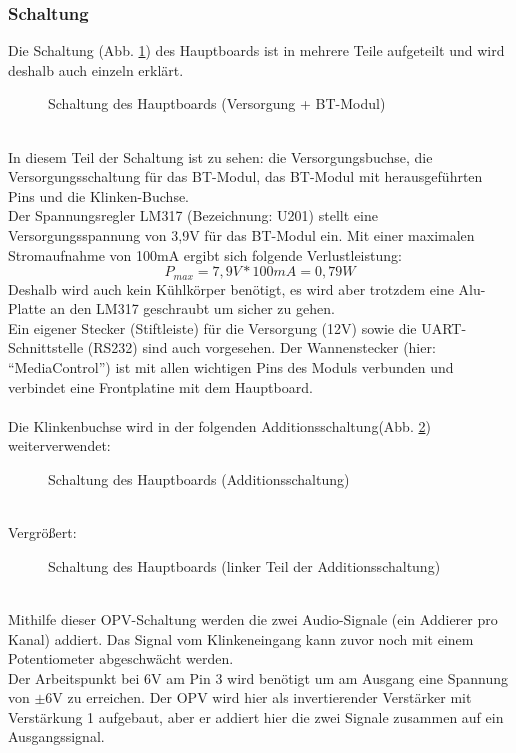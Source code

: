\subsubsection{Schaltung}
Die Schaltung (Abb. \ref{fig:abb3.3}) des Hauptboards ist in mehrere Teile aufgeteilt und wird deshalb auch einzeln erklärt.
\begin{figure} [h]
	\centering
	\caption{Schaltung des Hauptboards (Versorgung + BT-Modul)}\label {fig:abb3.3}
\end{figure} \\
In diesem Teil der Schaltung ist zu sehen: die Versorgungsbuchse, die Versorgungsschaltung für das BT-Modul, das BT-Modul mit herausgeführten Pins und die Klinken-Buchse.\\
Der Spannungsregler LM317 (Bezeichnung: U201) stellt eine Versorgungsspannung von 3,9V für das BT-Modul ein. Mit einer maximalen Stromaufnahme von 100mA ergibt sich folgende Verlustleistung:
\begin{equation}
	P_{max} = 7,9V * 100mA = 0,79W
\end{equation}
Deshalb wird auch kein Kühlkörper benötigt, es wird aber trotzdem eine Alu-Platte an den LM317 geschraubt um sicher zu gehen. \\
Ein eigener Stecker (Stiftleiste) für die Versorgung (12V) sowie die UART-Schnittstelle (RS232) sind auch vorgesehen. Der Wannenstecker (hier: \enquote{MediaControl}) ist mit allen wichtigen Pins des Moduls verbunden und verbindet eine Frontplatine mit dem Hauptboard. \\ \\
Die Klinkenbuchse wird in der folgenden Additionsschaltung(Abb. \ref {fig:abb3.4}) weiterverwendet:
\begin{figure} [h]
	\centering
	\caption{Schaltung des Hauptboards (Additionsschaltung)}\label {fig:abb3.4}
\end{figure} \\
Vergrößert:
\begin{figure} [h]
	\centering
	\caption{Schaltung des Hauptboards (linker Teil der Additionsschaltung)}
\end{figure} \\
Mithilfe dieser OPV-Schaltung werden die zwei Audio-Signale (ein Addierer pro Kanal) addiert. Das Signal vom Klinkeneingang kann zuvor noch mit einem Potentiometer abgeschwächt werden.\\
Der Arbeitspunkt bei 6V am Pin 3 wird benötigt um am Ausgang eine Spannung von $\pm$6V zu erreichen. Der OPV wird hier als invertierender Verstärker mit Verstärkung 1 aufgebaut, aber er addiert hier die zwei Signale zusammen auf ein Ausgangssignal.

